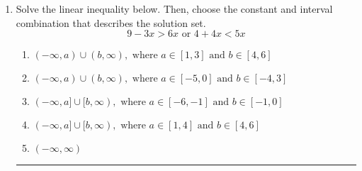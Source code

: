 \documentclass[14pt]{extbook}
\newcommand{\litem}[1]{\item#1\hspace*{-1cm}\rule{\textwidth}{0.4pt}}
\begin{document}
\begin{enumerate}
{\begin{enumerate}[label=\Alph*.]
\end{enumerate} }
\litem{
Solve the linear inequality below. Then, choose the constant and interval combination that describes the solution set.\[ 9 - 3 x > 6 x \text{ or } 4 + 4 x < 5 x \]\begin{enumerate}[label=\Alph*.]
\item \( (-\infty, a) \cup (b, \infty), \text{ where } a \in [1, 3] \text{ and } b \in [4, 6] \)
\item \( (-\infty, a) \cup (b, \infty), \text{ where } a \in [-5, 0] \text{ and } b \in [-4, 3] \)
\item \( (-\infty, a] \cup [b, \infty), \text{ where } a \in [-6, -1] \text{ and } b \in [-1, 0] \)
\item \( (-\infty, a] \cup [b, \infty), \text{ where } a \in [1, 4] \text{ and } b \in [4, 6] \)
\item \( (-\infty, \infty) \)

\end{enumerate} }
\end{enumerate}
\end{document}
